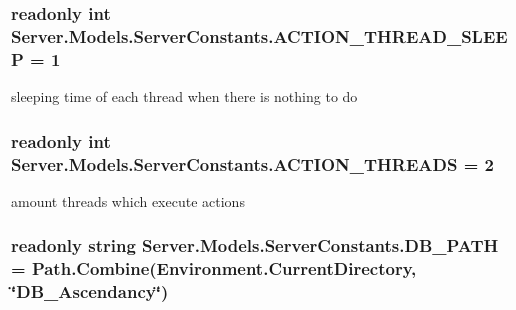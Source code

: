 \subsubsection[{A\+C\+T\+I\+O\+N\+\_\+\+T\+H\+R\+E\+A\+D\+\_\+\+S\+L\+E\+E\+P}]{\setlength{\rightskip}{0pt plus 5cm}readonly int Server.\+Models.\+Server\+Constants.\+A\+C\+T\+I\+O\+N\+\_\+\+T\+H\+R\+E\+A\+D\+\_\+\+S\+L\+E\+E\+P = 1\hspace{0.3cm}{\ttfamily [static]}}\label{classServer_1_1Models_1_1ServerConstants_a5e2befbb0254cde1849bcc0a328fb91b}


sleeping time of each thread when there is nothing to do 

\hypertarget{classServer_1_1Models_1_1ServerConstants_a1bfe8a7a369636cf459ee5769273b2b2}{}
\subsubsection[{A\+C\+T\+I\+O\+N\+\_\+\+T\+H\+R\+E\+A\+D\+S}]{\setlength{\rightskip}{0pt plus 5cm}readonly int Server.\+Models.\+Server\+Constants.\+A\+C\+T\+I\+O\+N\+\_\+\+T\+H\+R\+E\+A\+D\+S = 2\hspace{0.3cm}{\ttfamily [static]}}\label{classServer_1_1Models_1_1ServerConstants_a1bfe8a7a369636cf459ee5769273b2b2}


amount threads which execute actions 

\hypertarget{classServer_1_1Models_1_1ServerConstants_aed13f8301da1cc1f8e0bc6c7a8936807}{}
\subsubsection[{D\+B\+\_\+\+P\+A\+T\+H}]{\setlength{\rightskip}{0pt plus 5cm}readonly string Server.\+Models.\+Server\+Constants.\+D\+B\+\_\+\+P\+A\+T\+H = Path.\+Combine(Environment.\+Current\+Directory, \char`\"{}D\+B\+\_\+\+Ascendancy\char`\"{})\hspace{0.3cm}{\ttfamily [static]}}\label{classServer_1_1Models_1_1ServerConstants_aed13f8301da1cc1f8e0bc6c7a8936807}



